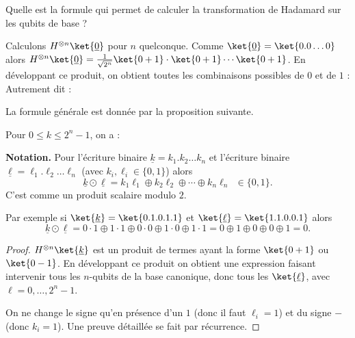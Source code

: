 \documentclass[11pt,class=report,crop=false]{standalone}
\begin{document}
Quelle est la formule qui permet de calculer la transformation de Hadamard sur les qubits de base ?


\begin{exemple}
Calculons $H^{\otimes n} \ket{\underline{0}}$ pour $n$ quelconque. 
Comme $\ket{\underline 0} = \ket{0.0\ldots0}$ alors
$H^{\otimes n} \ket{\underline{0}} = \frac{1}{\sqrt{2^n}} \ket{0+1} \cdot \ket{0+1} \cdots \ket{0+1}$.
En développant ce produit, on obtient toutes les combinaisons possibles de $0$ et de $1$ :
Autrement dit :


\end{exemple}

La formule générale est donnée par la proposition suivante.

\begin{proposition}
Pour $0 \le k \le 2^{n}-1$, on a :
\end{proposition}

\textbf{Notation.}
Pour l'écriture binaire $\underline{k} = k_1.k_2 \ldots k_n$ et l'écriture binaire
$\underline{\ell} = \ell_1.\ell_2 \ldots \ell_n$ (avec $k_i,\ell_i \in \{0,1\}$) alors
$$\underline{k} \odot \underline{\ell} = k_1\ell_1 \oplus k_2\ell_2 \oplus \cdots \oplus k_n \ell_n \ \ \in \{0,1\}.$$
C'est comme un produit scalaire modulo $2$.

Par exemple si $\ket{\underline{k}} = \ket{0.1.0.1.1}$ et $\ket{\underline\ell} = \ket{1.1.0.0.1}$ alors 
$$\underline{k} \odot \underline{\ell} = 0\cdot1 \oplus 1\cdot1 \oplus 0\cdot0 \oplus 1\cdot 0 \oplus 1\cdot 1 = 0 \oplus 1 \oplus 0 \oplus 0 \oplus 1 = 0.$$

\begin{proof}
$H^{\otimes n} \ket{\underline{k}}$ est un produit de termes ayant la forme $\ket{0+1}$ ou $\ket{0-1}$.
En développant ce produit on obtient une expression faisant intervenir tous les $n$-qubits de la base canonique, donc tous les $\ket{\underline{\ell}}$, avec $\ell=0,\ldots,2^n-1$.

On ne change le signe qu'en présence d'un $1$ (donc il faut $\ell_i=1$) et du signe \og{}$-$\fg{} (donc $k_i=1$).
Une preuve détaillée se fait par récurrence.
\end{proof}
\end{document}
